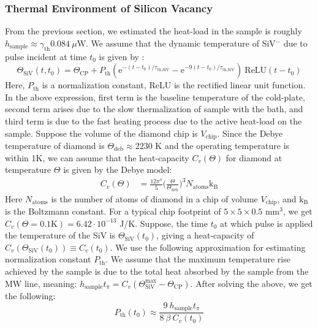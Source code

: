 \subsubsection{Thermal Environment of Silicon Vacancy}
From the previous section, we estimated the heat-load in the sample is roughly $h_{\text{sample}}\approx\gamma_{\text{th}}0.084~\mu$W. We assume that the dynamic temperature of SiV$^{-}$ due to pulse incident at time $t_{0}$ is given by \cite{nguyen2019integrated}:
\begin{equation}
    \Theta_{\text{SiV}}(t,t_{0   }) = \Theta_{\text{CP}} + P_{\text{th}} (\text{e}^{-(t-t_{0})/\tau_{\text{th,SiV}}} - \text{e}^{-9(t-t_{0})/\tau_{\text{th,SiV}}})~\text{ReLU}(t-t_{0})
\end{equation}
Here, $P_{\text{th}}$ is a normalization constant, $\text{ReLU}$ is the rectified linear unit function. In the above expression, first term is the baseline temperature of the cold-plate, second term arises due to the slow thermalization of sample with the bath, and third term is due to the fast heating process due to the active heat-load on the sample. Suppose the volume of the diamond chip is $V_{\text{chip}}$. Since the Debye temperature of diamond is $\Theta_{\text{deb}}\approx 2230$ K \cite{mukherjee1967debye} 
and the operating temperature is within 1K, we can assume that the heat-capacity $C_{v}(\Theta)$ for diamond at temperature $\Theta$ is given by the Debye model:
\begin{align} 
    C_{v}(\Theta) &= \frac{12\pi^{4}}{5}\bigg(\frac{\Theta}{\Theta_{\text{deb}}}\bigg)^{3}N_{\text{atoms}}\text{k}_{\text{B}}
\end{align}
Here $N_{\text{atoms}}$ is the number of atoms of diamond in a chip of volume $V_{\text{chip}}$, and $\text{k}_{\text{B}}$ is the Boltzmann constant. For a typical chip footprint of $5\times5\times0.5$ mm$^{3}$, we get $C_{v}(\Theta=0.1\text{K})=6.42\cdot10^{-13}$ J/K. Suppose, the time $t_{0}$ at which pulse is applied the temperature of the SiV is $\Theta_{\text{SiV}}(t_{0})$, giving a heat-capacity of $C_{v}(\Theta_{\text{SiV}}(t_{0}))\equiv C_{v}(t_{0})$. We use the following approximation for estimating normalization constant $P_{\text{th}}$. We assume that the maximum temperature rise achieved by the sample is due to the total heat absorbed by the sample from the MW line, meaning: $h_{\text{sample}}t_{\pi}=C_{v}(\Theta^{\text{max}}_{\text{SiV}}-\Theta_{\text{CP}})$. After solving the above, we get the following: 
\begin{equation}
    P_{\text{th}}(t_{0}) \approx \frac{9~h_{\text{sample}}t_{\pi}}{8~\beta~C_{v}(t_{0})}
\end{equation}

